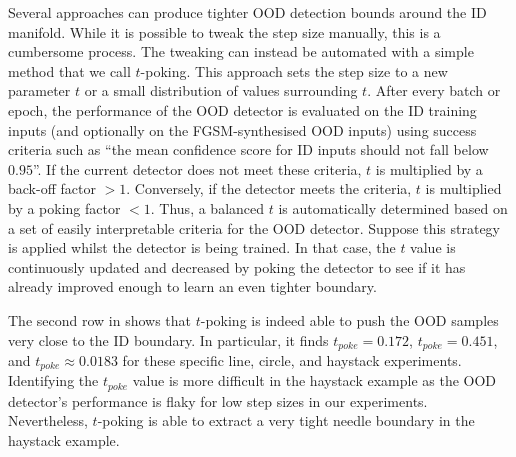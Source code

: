 \noindent Several approaches can produce tighter OOD detection bounds around the ID manifold. While it is possible to tweak the step size manually, this is a cumbersome process. The tweaking can instead be automated with a simple method that we call $t$-poking. This approach sets the step size to a new parameter $t$ or a small distribution of values surrounding $t$. After every batch or epoch, the performance of the OOD detector is evaluated on the ID training inputs (and optionally on the FGSM-synthesised OOD inputs) using success criteria such as ``the mean confidence score for ID inputs should not fall below $0.95$''. If the current detector does not meet these criteria, $t$ is multiplied by a back-off factor $>1$. Conversely, if the detector meets the criteria, $t$ is multiplied by a poking factor $<1$. Thus, a balanced $t$ is automatically determined based on a set of easily interpretable criteria for the OOD detector. Suppose this strategy is applied whilst the detector is being trained. In that case, the $t$ value is continuously updated and decreased by poking the detector to see if it has already improved enough to learn an even tighter boundary.

The second row in  shows that $t$-poking is indeed able to push the OOD samples very close to the ID boundary. In particular, it finds $t_{poke} = 0.172$, $t_{poke} = 0.451$, and $t_{poke} \approx 0.0183$ for these specific line, circle, and haystack experiments. Identifying the $t_{poke}$ value is more difficult in the haystack example as the OOD detector's performance is flaky for low step sizes in our experiments. Nevertheless, $t$-poking is able to extract a very tight needle boundary in the haystack example.


